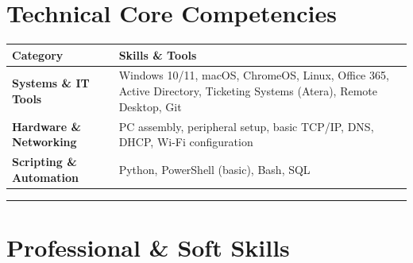 \documentclass[
]{book}
\newcounter{none} %
\begin{document}
\section*{Technical Core Competencies}\label{technical-core-competencies}

{\def\LTcaptype{none} %
\begin{longtable}[]{@{}
  >{\raggedright\arraybackslash}p{}
  >{\raggedright\arraybackslash}p{}@{}}
\toprule\noalign{}
\begin{minipage}[b]{\linewidth}\raggedright
Category
\end{minipage} & \begin{minipage}[b]{\linewidth}\raggedright
Skills \& Tools
\end{minipage} \\
\midrule\noalign{}
\endhead
\bottomrule\noalign{}
\endlastfoot
\textbf{Systems \& IT Tools} & Windows 10/11, macOS, ChromeOS, Linux, Office 365, Active Directory, Ticketing Systems (Atera), Remote Desktop, Git \\
\textbf{Hardware \& Networking} & PC assembly, peripheral setup, basic TCP/IP, DNS, DHCP, Wi-Fi configuration \\
\textbf{Scripting \& Automation} & Python, PowerShell (basic), Bash, SQL \\
\end{longtable}
}

\begin{center}\rule{0.5\linewidth}{0.5pt}\end{center}

\section*{Professional \& Soft Skills}\label{professional-soft-skills}
\end{document}
